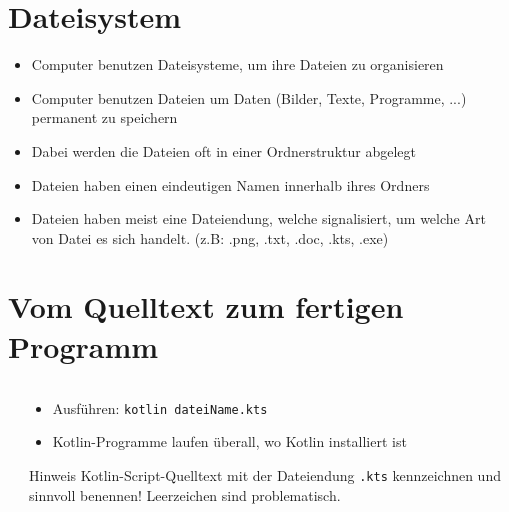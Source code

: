 \section{Dateisystem}
\begin{frame}
    \slidehead
    \begin{itemize}
        \item Computer benutzen Dateisysteme, um ihre Dateien zu organisieren
        \item Computer benutzen Dateien um Daten (Bilder, Texte, Programme, ...) permanent zu speichern
        \item Dabei werden die Dateien oft in einer Ordnerstruktur abgelegt
        \item Dateien haben einen eindeutigen Namen innerhalb ihres Ordners
        \item Dateien haben meist eine Dateiendung, welche signalisiert, um welche Art von Datei es sich handelt. (z.B: .png, .txt, .doc, .kts, .exe)
    \end{itemize}
\end{frame}

\section{Vom Quelltext zum fertigen Programm}
\begin{frame}
    \slidehead

    \begin{columns}[T]
        \begin{column}{.4\textwidth}
        \end{column}
        \begin{column}{.6\textwidth}
            \begin{itemize}
                \item Ausführen: \texttt{kotlin dateiName.kts}
                \item Kotlin-Programme laufen überall, wo Kotlin installiert ist
            \end{itemize}
            \begin{block}{Hinweis}
                Kotlin-Script-Quelltext mit der Dateiendung \texttt{.kts} kennzeichnen und sinnvoll benennen! Leerzeichen sind problematisch.
            \end{block}
        \end{column}
    \end{columns}
\end{frame}

